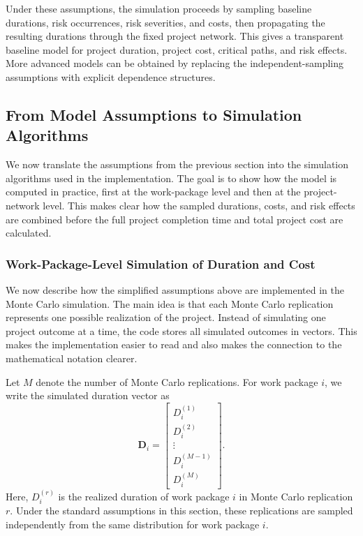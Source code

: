 \documentclass[11pt,a4paper]{article}
\newcommand{\1}{\mathbf{1}}
\theoremstyle{definition}
\theoremstyle{plain}
\theoremstyle{remark}
\numberwithin{equation}{section}
\begin{document}
Under these assumptions, the simulation proceeds by sampling baseline durations, risk occurrences, risk severities, and costs, then propagating the resulting durations through the fixed project network. This gives a transparent baseline model for project duration, project cost, critical paths, and risk effects. More advanced models can be obtained by replacing the independent-sampling assumptions with explicit dependence structures.

\subsection{From Model Assumptions to Simulation Algorithms}

We now translate the assumptions from the previous section into the simulation algorithms used in the implementation. The goal is to show how the model is computed in practice, first at the work-package level and then at the project-network level. This makes clear how the sampled durations, costs, and risk effects are combined before the full project completion time and total project cost are calculated.

\subsubsection{Work-Package-Level Simulation of Duration and Cost}

We now describe how the simplified assumptions above are implemented in the Monte Carlo simulation. The main idea is that each Monte Carlo replication represents one possible realization of the project. Instead of simulating one project outcome at a time, the code stores all simulated outcomes in vectors. This makes the implementation easier to read and also makes the connection to the mathematical notation clearer.

Let $M$ denote the number of Monte Carlo replications. For work package $i$, we write the simulated duration vector as
\[
\mathbf{D}_i
=
\begin{bmatrix}
D_i^{(1)}\\
D_i^{(2)}\\
\vdots\\
D_i^{(M-1)}\\
D_i^{(M)}
\end{bmatrix}.
\]
Here, $D_i^{(r)}$ is the realized duration of work package $i$ in Monte Carlo replication $r$. Under the standard assumptions in this section, these replications are sampled independently from the same distribution for work package $i$.
\end{document}
